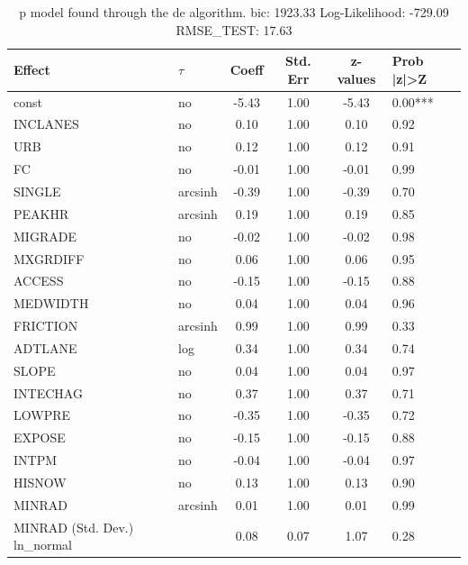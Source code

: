 \begin{table}
	\caption{p model found through the de algorithm. bic: 1923.33 Log-Likelihood: -729.09 RMSE_TEST: 17.63}
	\begin{center}
		\begin{tabular}{|l|l|c|c|c|l|}
			\hline
			Effect & $\tau$ & Coeff & Std. Err & z-values & Prob |z|>Z \\
			\hline
			const & no & -5.43 & 1.00 & -5.43 & 0.00*** \\
			\hline
			INCLANES & no & 0.10 & 1.00 & 0.10 & 0.92 \\
			\hline
			URB & no & 0.12 & 1.00 & 0.12 & 0.91 \\
			\hline
			FC & no & -0.01 & 1.00 & -0.01 & 0.99 \\
			\hline
			SINGLE & arcsinh & -0.39 & 1.00 & -0.39 & 0.70 \\
			\hline
			PEAKHR & arcsinh & 0.19 & 1.00 & 0.19 & 0.85 \\
			\hline
			MIGRADE & no & -0.02 & 1.00 & -0.02 & 0.98 \\
			\hline
			MXGRDIFF & no & 0.06 & 1.00 & 0.06 & 0.95 \\
			\hline
			ACCESS & no & -0.15 & 1.00 & -0.15 & 0.88 \\
			\hline
			MEDWIDTH & no & 0.04 & 1.00 & 0.04 & 0.96 \\
			\hline
			FRICTION & arcsinh & 0.99 & 1.00 & 0.99 & 0.33 \\
			\hline
			ADTLANE & log & 0.34 & 1.00 & 0.34 & 0.74 \\
			\hline
			SLOPE & no & 0.04 & 1.00 & 0.04 & 0.97 \\
			\hline
			INTECHAG & no & 0.37 & 1.00 & 0.37 & 0.71 \\
			\hline
			LOWPRE & no & -0.35 & 1.00 & -0.35 & 0.72 \\
			\hline
			EXPOSE & no & -0.15 & 1.00 & -0.15 & 0.88 \\
			\hline
			INTPM & no & -0.04 & 1.00 & -0.04 & 0.97 \\
			\hline
			HISNOW & no & 0.13 & 1.00 & 0.13 & 0.90 \\
			\hline
			MINRAD & arcsinh & 0.01 & 1.00 & 0.01 & 0.99 \\
			\hline
			MINRAD (Std. Dev.) ln_normal &  & 0.08 & 0.07 & 1.07 & 0.28 \\
			\hline
		\end{tabular}
	\end{center}
\end{table}